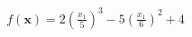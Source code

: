 \documentclass[preview]{standalone}
\begin{document}
\begin{align*}
f(\mathbf{x})=2(\frac{x_1}{5})^3 -5 (\frac{x_1}{6})^2 + 4
\end{align*}
\end{document}
